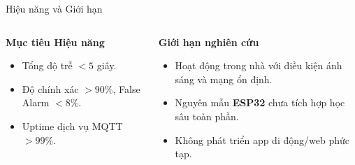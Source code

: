\begin{frame}{Hiệu năng và Giới hạn}
    \begin{columns}[T]
        \begin{column}{0.48\textwidth}
            \textbf{Mục tiêu Hiệu năng}
            \begin{itemize}
                \item Tổng độ trễ $<5$ giây.
                \item Độ chính xác $>90\%$, False Alarm $<8\%$.
                \item Uptime dịch vụ MQTT $>99\%$.
            \end{itemize}
        \end{column}
        \begin{column}{0.48\textwidth}
            \textbf{Giới hạn nghiên cứu}
            \begin{itemize}
                \item Hoạt động trong nhà với điều kiện ánh sáng và mạng ổn định.
                \item Nguyên mẫu \textbf{ESP32} chưa tích hợp học sâu toàn phần.
                \item Không phát triển app di động/web phức tạp.
            \end{itemize}
        \end{column}
    \end{columns}
\end{frame}

